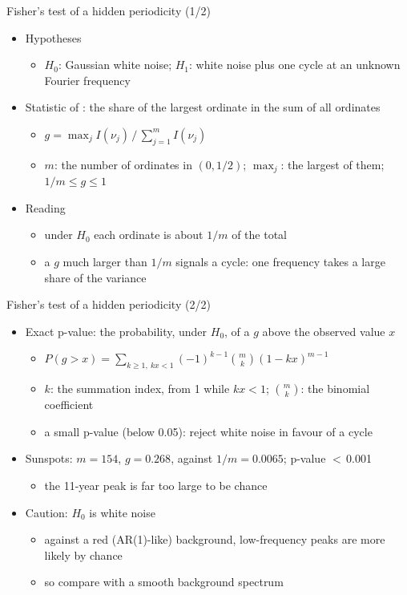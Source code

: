 \begin{frame}{Fisher's test of a hidden periodicity (1/2)}
\itemsize{\small}
\begin{itemize}
    \item Hypotheses
    \begin{itemize}
        \item $H_0$: Gaussian white noise; $H_1$: white noise plus one cycle at an unknown Fourier frequency
    \end{itemize}
    \item Statistic of : the share of the largest ordinate in the sum of all ordinates
    \begin{itemize}
        \item $g = \max_j I(\nu_j)\,/\,\sum_{j=1}^{m} I(\nu_j)$
        \item $m$: the number of ordinates in $(0, 1/2)$; $\max_j$: the largest of them; $1/m \le g \le 1$
    \end{itemize}
    \item Reading
    \begin{itemize}
        \item under $H_0$ each ordinate is about $1/m$ of the total
        \item a $g$ much larger than $1/m$ signals a cycle: one frequency takes a large share of the variance
    \end{itemize}
\end{itemize}
\end{frame}

\begin{frame}{Fisher's test of a hidden periodicity (2/2)}
\itemsize{\small}
\begin{itemize}
    \item Exact p-value: the probability, under $H_0$, of a $g$ above the observed value $x$
    \begin{itemize}
        \item $P(g > x) = \sum_{k \ge 1,\ kx < 1}(-1)^{k-1}\binom{m}{k}(1 - kx)^{m-1}$
        \item $k$: the summation index, from 1 while $kx < 1$; $\binom{m}{k}$: the binomial coefficient
        \item a small p-value (below 0.05): reject white noise in favour of a cycle
    \end{itemize}
    \item Sunspots: $m = 154$, $g = 0.268$, against $1/m = 0.0065$; p-value $<$\,0.001
    \begin{itemize}
        \item the 11-year peak is far too large to be chance
    \end{itemize}
    \item Caution: $H_0$ is white noise
    \begin{itemize}
        \item against a red (AR(1)-like) background, low-frequency peaks are more likely by chance
        \item so compare with a smooth background spectrum
    \end{itemize}
\end{itemize}
\end{frame}

